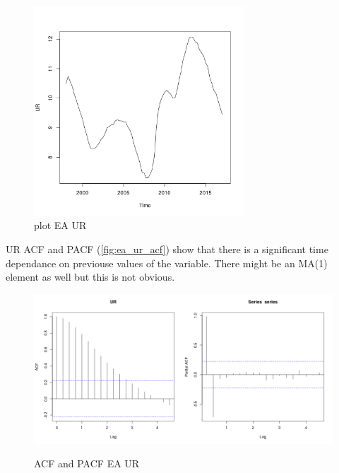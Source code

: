 \documentclass[10pt]{article}
\begin{document}
\begin{figure}[h!]
\centering
\includegraphics[width = 0.7\textwidth]{../plots/ea_UR}
\caption{plot EA UR}
\label{fig:ea_ur}
\end{figure}

UR ACF and PACF (\autoref{fig:ea_ur_acf}) show that there is a significant time dependance on previouse values of the variable. There might be an MA(1) element as well but this is not obvious.

\begin{figure}[h!]
\centering
\includegraphics[width = 0.5\textwidth]{../acf/ea_UR}\includegraphics[width = 0.5\textwidth]{../pacf/ea_UR}
\caption{ACF and PACF EA UR}
\label{fig:ea_ur_acf}
\end{figure}
\end{document}

